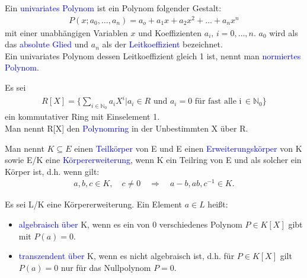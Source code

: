 \begin{definition}
Ein \textcolor{blue}{univariates Polynom} ist ein Polynom folgender Gestalt:
\begin{align*}
P(x; a_0,\ldots,a_n) = a_o + a_1x + a_2x^2 + \ldots + a_nx^n
\end{align*}
mit einer unabhängigen Variablen $x$ und Koeffizienten $a_i, \, i = 0,\ldots,n$. $a_0$ wird als das \textcolor{blue}{absolute Glied} und $a_n$ als der \textcolor{blue}{Leitkoeffizient} bezeichnet.\\
Ein univariates Polynom dessen Leitkoeffizient gleich 1 ist, nennt man \textcolor{blue}{normiertes Polynom}.
\end{definition}

\begin{definition}
Es sei 
\begin{align*}
R[X] = \{\sum_{i\in\mathbb{N}_0} a_i X^i |a_i \in R \text{ und } a_i = 0 \text{ für fast alle i} \,\in \mathbb{N}_0 \}
\end{align*}
ein kommutativer Ring mit Einselement 1. \\
Man nennt R[X] den \textcolor{blue}{Polynomring} in der Unbestimmten X über R. \cite{Karpfinger}
\end{definition}

\begin{definition}
Man nennt $K \subseteq E$ einen \textcolor{blue}{Teilkörper} von E und E einen \textcolor{blue}{Erweiterungskörper} von K sowie E/K eine \textcolor{blue}{Körpererweiterung}, wenn K ein Teilring von E und als solcher ein Körper ist, d.h. wenn gilt\cite{Karpfinger}:
\begin{align*}
a, b, c\in K, \quad c \neq 0 \quad \Rightarrow \quad a-b,ab,c^{-1}\in K. 
\end{align*} 
\end{definition}

\begin{definition}
Es sei L/K eine Körpererweiterung. Ein Element $a \in L$ heißt:
\begin{itemize}
\item \textcolor{blue}{algebraisch über} K, wenn es ein von 0 verschiedenes Polynom $P \in K[X]$ gibt mit $P(a) = 0$.
\item \textcolor{blue}{transzendent über} K, wenn es nicht algebraisch ist, d.h. für $P \in K[X]$ gilt $P(a) = 0$ nur für das Nullpolynom $P = 0$. \cite{Karpfinger}  
\end{itemize} 
\end{definition}

